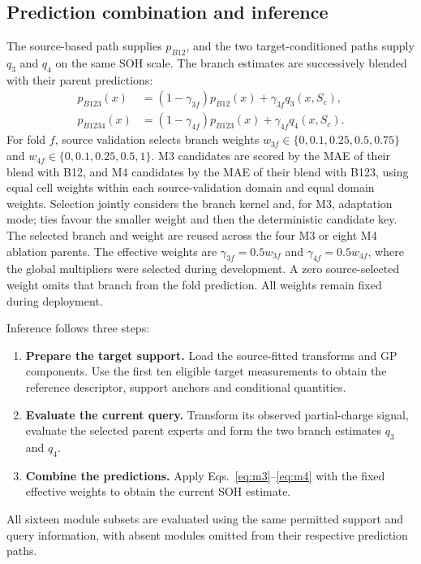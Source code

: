 \documentclass[preprint,12pt]{elsarticle}
\begin{document}
\subsection{Prediction combination and inference}
The source-based path supplies $p_{B12}$, and the two target-conditioned paths supply $q_3$ and $q_4$ on the same SOH scale. The branch estimates are successively blended with their parent predictions:
\begin{align}
p_{B123}(x)&=(1-\gamma_{3f})p_{B12}(x)+\gamma_{3f}q_3(x,S_c),\label{eq:m3}\\
p_{B1234}(x)&=(1-\gamma_{4f})p_{B123}(x)+\gamma_{4f}q_4(x,S_c).\label{eq:m4}
\end{align}
For fold $f$, source validation selects branch weights $w_{3f}\in\{0,0.1,0.25,0.5,0.75\}$ and $w_{4f}\in\{0,0.1,0.25,0.5,1\}$. M3 candidates are scored by the MAE of their blend with B12, and M4 candidates by the MAE of their blend with B123, using equal cell weights within each source-validation domain and equal domain weights. Selection jointly considers the branch kernel and, for M3, adaptation mode; ties favour the smaller weight and then the deterministic candidate key. The selected branch and weight are reused across the four M3 or eight M4 ablation parents. The effective weights are $\gamma_{3f}=0.5w_{3f}$ and $\gamma_{4f}=0.5w_{4f}$, where the global multipliers were selected during development. A zero source-selected weight omits that branch from the fold prediction. All weights remain fixed during deployment.

Inference follows three steps:
\begin{enumerate}
\item \textbf{Prepare the target support.} Load the source-fitted transforms and GP components. Use the first ten eligible target measurements to obtain the reference descriptor, support anchors and conditional quantities.
\item \textbf{Evaluate the current query.} Transform its observed partial-charge signal, evaluate the selected parent experts and form the two branch estimates $q_3$ and $q_4$.
\item \textbf{Combine the predictions.} Apply Eqs.~\eqref{eq:m3}--\eqref{eq:m4} with the fixed effective weights to obtain the current SOH estimate.
\end{enumerate} All sixteen module subsets are evaluated using the same permitted support and query information, with absent modules omitted from their respective prediction paths.
\end{document}
